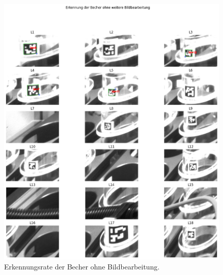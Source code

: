     \begin{figure}
        \caption[Erkennungsrate der Becher ohne Bildbearbeitung]{\small Erkennungsrate der Becher ohne Bildbearbeitung.}\label{fig:figure22}
        \includegraphics[width = \textwidth]{Bilder/ErkennungsrateOBB.png}
        \centering
    \end{figure}

